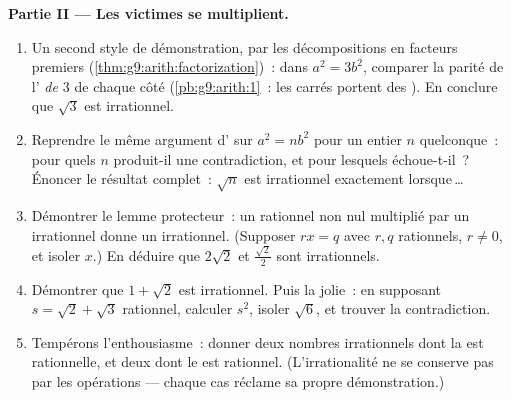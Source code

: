 \begin{problem}
\medskip
\noindent\textbf{Partie II --- Les victimes se multiplient.}
\begin{enumerate}[resume]
  \item Un second style de démonstration, par les décompositions en
        facteurs premiers (\cref{thm:g9:arith:factorization})~: dans
        $a^2 = 3b^2$, comparer la parité de l'\emph{ de $3$}
        de chaque côté (\cref{pb:g9:arith:1}~: les carrés portent
        des  ). En conclure que $\sqrt3$ est
        irrationnel.
  \item Reprendre le même argument d' sur $a^2 = n b^2$
        pour un entier $n$ quelconque~: pour quels $n$
        produit-il une contradiction, et pour lesquels échoue-t-il~?
        Énoncer le résultat complet~: $\sqrt n$ est irrationnel
        exactement lorsque\,\dots
  \item Démontrer le lemme protecteur~: un rationnel non nul
        multiplié par un irrationnel donne un irrationnel.
        (Supposer $r x = q$ avec $r, q$ rationnels, $r \neq 0$, et
        isoler $x$.) En déduire que $2\sqrt2$ et
        $\frac{\sqrt2}{2}$ sont irrationnels.
  \item Démontrer que $1 + \sqrt2$ est irrationnel. Puis la jolie~:
        en supposant $s = \sqrt2 + \sqrt3$ rationnel, calculer
        $s^2$, isoler $\sqrt6$, et trouver la contradiction.
  \item Tempérons l'enthousiasme~: donner deux nombres irrationnels
        dont la \emph{} est rationnelle, et deux dont le
        \emph{} est rationnel. (L'irrationalité ne se
        conserve pas par les opérations --- chaque cas réclame sa
        propre démonstration.)
\end{enumerate}


\end{problem}
